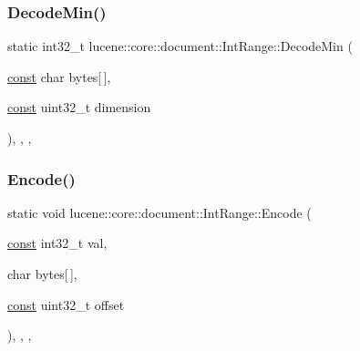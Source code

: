 \mbox{\label{classlucene_1_1core_1_1document_1_1IntRange_a72ee8f2bcf5b827675b118ff73f650b4}} 
\subsubsection{\texorpdfstring{Decode\+Min()}{DecodeMin()}}
{\footnotesize\ttfamily static int32\+\_\+t lucene\+::core\+::document\+::\+Int\+Range\+::\+Decode\+Min (\begin{DoxyParamCaption}\item[{\mbox{\hyperlink{ZlibCrc32_8h_a2c212835823e3c54a8ab6d95c652660e}{const}} char}]{bytes\mbox{[}$\,$\mbox{]},  }\item[{\mbox{\hyperlink{ZlibCrc32_8h_a2c212835823e3c54a8ab6d95c652660e}{const}} uint32\+\_\+t}]{dimension }\end{DoxyParamCaption})\hspace{0.3cm}{\ttfamily [inline]}, {\ttfamily [static]}, {\ttfamily [private]}, {\ttfamily [noexcept]}}

\mbox{\label{classlucene_1_1core_1_1document_1_1IntRange_a033f58b4f7e2faa72a8ce5e875da527a}} 
\subsubsection{\texorpdfstring{Encode()}{Encode()}}
{\footnotesize\ttfamily static void lucene\+::core\+::document\+::\+Int\+Range\+::\+Encode (\begin{DoxyParamCaption}\item[{\mbox{\hyperlink{ZlibCrc32_8h_a2c212835823e3c54a8ab6d95c652660e}{const}} int32\+\_\+t}]{val,  }\item[{char}]{bytes\mbox{[}$\,$\mbox{]},  }\item[{\mbox{\hyperlink{ZlibCrc32_8h_a2c212835823e3c54a8ab6d95c652660e}{const}} uint32\+\_\+t}]{offset }\end{DoxyParamCaption})\hspace{0.3cm}{\ttfamily [inline]}, {\ttfamily [static]}, {\ttfamily [private]}, {\ttfamily [noexcept]}}


